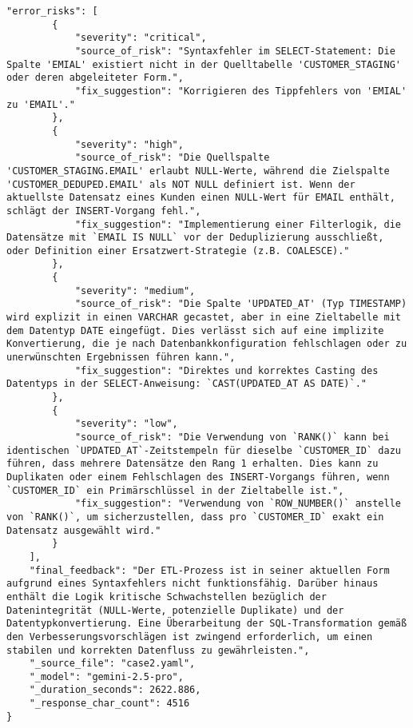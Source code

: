 \begin{lstlisting}[caption={Ausgabe: Gemini 2.5 Pro Anwendungsfall 2 Robustheitsdurchlauf},label={gemini_case2_prompt3}]
    "error_risks": [
        {
            "severity": "critical",
            "source_of_risk": "Syntaxfehler im SELECT-Statement: Die Spalte 'EMIAL' existiert nicht in der Quelltabelle 'CUSTOMER_STAGING' oder deren abgeleiteter Form.",
            "fix_suggestion": "Korrigieren des Tippfehlers von 'EMIAL' zu 'EMAIL'."
        },
        {
            "severity": "high",
            "source_of_risk": "Die Quellspalte 'CUSTOMER_STAGING.EMAIL' erlaubt NULL-Werte, während die Zielspalte 'CUSTOMER_DEDUPED.EMAIL' als NOT NULL definiert ist. Wenn der aktuellste Datensatz eines Kunden einen NULL-Wert für EMAIL enthält, schlägt der INSERT-Vorgang fehl.",
            "fix_suggestion": "Implementierung einer Filterlogik, die Datensätze mit `EMAIL IS NULL` vor der Deduplizierung ausschließt, oder Definition einer Ersatzwert-Strategie (z.B. COALESCE)."
        },
        {
            "severity": "medium",
            "source_of_risk": "Die Spalte 'UPDATED_AT' (Typ TIMESTAMP) wird explizit in einen VARCHAR gecastet, aber in eine Zieltabelle mit dem Datentyp DATE eingefügt. Dies verlässt sich auf eine implizite Konvertierung, die je nach Datenbankkonfiguration fehlschlagen oder zu unerwünschten Ergebnissen führen kann.",
            "fix_suggestion": "Direktes und korrektes Casting des Datentyps in der SELECT-Anweisung: `CAST(UPDATED_AT AS DATE)`."
        },
        {
            "severity": "low",
            "source_of_risk": "Die Verwendung von `RANK()` kann bei identischen `UPDATED_AT`-Zeitstempeln für dieselbe `CUSTOMER_ID` dazu führen, dass mehrere Datensätze den Rang 1 erhalten. Dies kann zu Duplikaten oder einem Fehlschlagen des INSERT-Vorgangs führen, wenn `CUSTOMER_ID` ein Primärschlüssel in der Zieltabelle ist.",
            "fix_suggestion": "Verwendung von `ROW_NUMBER()` anstelle von `RANK()`, um sicherzustellen, dass pro `CUSTOMER_ID` exakt ein Datensatz ausgewählt wird."
        }
    ],
    "final_feedback": "Der ETL-Prozess ist in seiner aktuellen Form aufgrund eines Syntaxfehlers nicht funktionsfähig. Darüber hinaus enthält die Logik kritische Schwachstellen bezüglich der Datenintegrität (NULL-Werte, potenzielle Duplikate) und der Datentypkonvertierung. Eine Überarbeitung der SQL-Transformation gemäß den Verbesserungsvorschlägen ist zwingend erforderlich, um einen stabilen und korrekten Datenfluss zu gewährleisten.",
    "_source_file": "case2.yaml",
    "_model": "gemini-2.5-pro",
    "_duration_seconds": 2622.886,
    "_response_char_count": 4516
}
\end{lstlisting}

